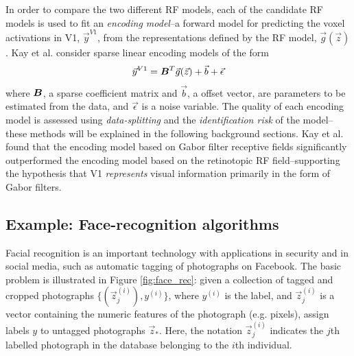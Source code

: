 In order to compare the two different RF models, each of the candidate
RF models is used to fit an \emph{encoding model}--a forward model for
predicting the voxel activations in V1, $\vec{y}^{V1}$, from the
representations defined by the RF model, $\vec{g}(\vec{z})$.  Kay et
al. consider sparse linear encoding models of the form
\[
\vec{y}^{V1} = \boldsymbol{B}^T \vec{g}(\vec{z})  + \vec{b} + \vec{\epsilon}
\]
where $\boldsymbol{B}$, a sparse coefficient matrix and $\vec{b}$, a offset
vector, are parameters to be estimated from the data, and
$\vec{\epsilon}$ is a noise variable.  The quality of each encoding
model is assessed using \emph{data-splitting} and the
\emph{identification risk} of the model--these methods will be
explained in the following background sections.  Kay et al. found that
the encoding model based on Gabor filter receptive fields
significantly outperformed the encoding model based on the retinotopic
RF field--supporting the hypothesis that V1 \emph{represents} visual
information primarily in the form of Gabor filters.

\subsection{Example: Face-recognition algorithms}

Facial recognition is an important technology with applications in
security and in social media, such as automatic tagging of photographs
on Facebook.  The basic problem is illustrated in Figure
\ref{fig:face_rec}: given a collection of tagged and cropped
photographs $\{(\vec{z}_j^{(i)}), y^{(i)}\}$, where $y^{(i)}$ is the
label, and $\vec{z}_j^{(i)}$ is a vector containing the numeric
features of the photograph (e.g. pixels), assign labels $y$ to
untagged photographs $\vec{z}_*$.  Here, the notation
$\vec{z}_j^{(i)}$ indicates the $j$th labelled photograph in the
database belonging to the $i$th individual. 

